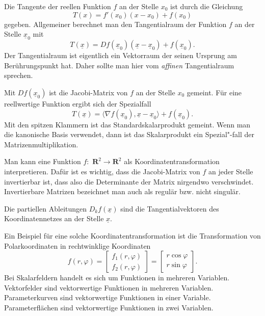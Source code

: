 \documentclass[a4paper,10pt,fleqn,twocolumn,twoside]{article}
\numberwithin{equation}{section}
\begin{document}
Die Tangente der reellen Funktion $f$ an der Stelle $x_0$
ist durch die Gleichung
\begin{equation}
T(x) = f'(x_0)(x-x_0)+f(x_0)
\end{equation}
%
gegeben. Allgemeiner berechnet man den Tangentialraum der Funktion $f$
an der Stelle $\underline x_0$ mit
\begin{equation}
T(\underline x)
= Df(\underline x_0)(\underline x-\underline x_0)+f(\underline x_0).
\end{equation}
%
Der Tangentialraum ist eigentlich ein Vektorraum der seinen Ursprung
am Berührungspunkt hat. Daher sollte man hier vom \textit{affinen}
Tangentialraum sprechen.

Mit $Df(\underline x_0)$ ist die Jacobi-Matrix von $f$ an der
Stelle $x_0$ gemeint. Für eine reellwertige Funktion ergibt sich der
Spezialfall
\begin{equation}
T(\underline x) = \langle\nabla f(\underline x_0),\underline x
-\underline x_0\rangle+f(\underline x_0).
\end{equation}
%
Mit den spitzen Klammern ist das Standardskalarprodukt gemeint.
Wenn man die kanonische Basis verwendet, dann ist das Skalarprodukt
ein Spezial"-fall der Matrizenmultiplikation.

Man kann eine Funktion $f{:}\,\, \mathbf R^2\rightarrow \mathbf R^2$
als Koordinatentransformation interpretieren. Dafür ist es wichtig,
dass die Jacobi-Matrix von $f$ an jeder Stelle invertierbar ist,
dass also die Determinante der Matrix nirgendwo verschwindet.
Invertierbare Matrizen bezeichnet man auch als regulär bzw.
nicht singulär.

Die partiellen Ableitungen $D_kf(\underline x)$ sind die
Tangentialvektoren des Koordinatennetzes an der Stelle
$\underline x$.

Ein Beispiel für eine solche Koordinatentransformation ist die
Transformation von Polarkoordinaten in rechtwinklige Koordinaten
\begin{equation}
f(r,\varphi)
= \begin{bmatrix}
f_1(r,\varphi)\\
f_2(r,\varphi)
\end{bmatrix}
= \begin{bmatrix}
r\cos\varphi\\
r\sin\varphi
\end{bmatrix}.
\end{equation}
\noindent
Bei Skalarfeldern handelt es sich um Funktionen in mehreren
Variablen. Vektorfelder sind vektorwertige Funktionen in mehreren
Variablen. Parameterkurven sind vektorwertige Funktionen in einer
Variable. Parameterflächen sind vektorwertige Funktionen in zwei
Variablen.
\end{document}
